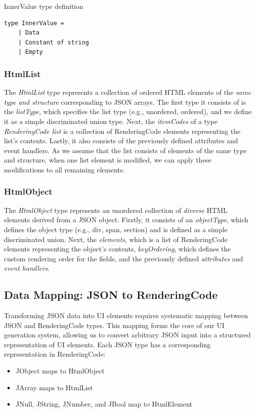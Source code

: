 \begin{listing}[htbp]
	\caption{InnerValue type definition}
	\label{fig:innerVal-type}
	\begin{lstlisting}
type InnerValue =
    | Data
    | Constant of string
    | Empty
    \end{lstlisting}
\end{listing}

\subsubsection{HtmlList}
The \emph{HtmlList} type represents a collection of ordered HTML elements of the \emph{same type and structure} corresponding to JSON arrays.
The first type it consists of is the \emph{listType}, which specifies the list type (e.g., unordered, ordered), and we define it as a simple discriminated union type.
Next, the \emph{itemCodes} of a type \emph{RenderingCode list} is a collection of RenderingCode elements representing the list's contents.
Lastly, it also consists of the previously defined attributes and event handlers.
As we assume that the list consists of elements of the same type and structure, when one list element is modified, we can apply these modifications to all remaining elements.

\subsubsection{HtmlObject}
The \emph{HtmlObject} type represents an unordered collection of \emph{diverse} HTML elements derived from a JSON object.
Firstly, it consists of an \emph{objectType}, which defines the object type (e.g., div, span, section) and is defined as a simple discriminated union.
Next, the \emph{elements}, which is a list of RenderingCode elements representing the object's contents, \emph{keyOrdering}, which defines the custom rendering order for the fields,
and the previously defined \emph{attributes} and \emph{event handlers}.


\subsection{Data Mapping: JSON to RenderingCode}
\label{sec:mapping}
Transforming JSON data into UI elements requires systematic mapping between JSON and RenderingCode types.
This mapping forms the core of our UI generation system, allowing us to convert arbitrary JSON input into a structured representation of UI elements.
Each JSON type has a corresponding representation in RenderingCode:
\begin{itemize}
	\item JObject maps to HtmlObject
	\item JArray maps to HtmlList
	\item JNull, JString, JNumber, and JBool map to HtmlElement
\end{itemize}

